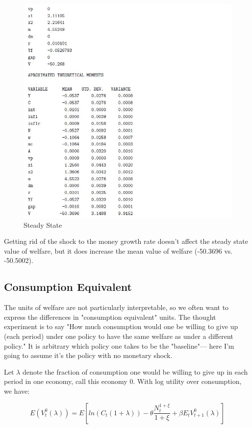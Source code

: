 \documentclass[cn,10pt,math=newtx,citestyle=gb7714-2015,bibstyle=gb7714-2015]{elegantbook}
\begin{document}
	\begin{figure}[htbp!]
		\centering
		\includegraphics[width=0.8\linewidth]{FIG/alternativeSS}
		\caption{Steady State}\label{6.3}
		\centering
	\end{figure}
	
	Getting rid of the shock to the money growth rate doesn't affect the steady state value of welfare, but it does increase the mean value of welfare (-50.3696 vs. -50.5002).
	
	\subsection{Consumption Equivalent}
	
	The units of welfare are not particularly interpretable, so we often want to express the differences in "consumption equivalent" units. The thought experiment is to say "How much consumption would one be willing to give up (each period) under one policy to have the same welfare as under a different policy." It is arbitrary which policy one takes to be the "baseline"--- here I'm going to assume it's the policy with no monetary shock.
	
	Let $\lambda$ denote the fraction of consumption one would be willing to give up in each period in one economy, call this economy 0. With log utility over consumption, we have:
	
	$$E(V_t^0(\lambda))=E\left[ln(C_t(1+\lambda))-\theta\frac{N_t^{1+\xi}}{1+\xi}+\beta E_tV_{t+1}^0(\lambda)\right]$$
	
\end{document}

